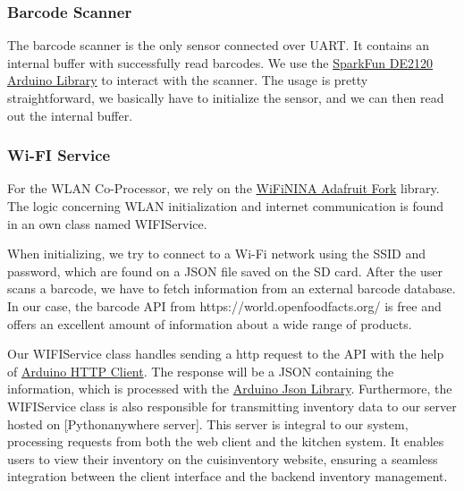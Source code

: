 \documentclass{article}
\begin{document}
\subsubsection{Barcode Scanner}
The barcode scanner is the only sensor connected over UART. It contains an internal buffer with successfully read barcodes.
We use the \href{https://github.com/sparkfun/SparkFun_DE2120_Arduino_Library}{SparkFun DE2120 Arduino Library} to interact with the scanner.
The usage is pretty straightforward, we basically have to initialize the sensor, and we can then read out the internal buffer.

\subsubsection{Wi-FI Service}
For the WLAN Co-Processor, we rely on the \href{https://github.com/adafruit/WiFiNINA}{WiFiNINA Adafruit Fork} library.
The logic concerning WLAN initialization and internet communication is found in an own class named WIFIService.

When initializing, we try to connect to a Wi-Fi network using the SSID and password, which are found on a JSON file saved on the SD card.
After the user scans a barcode, we have to fetch information from an external barcode database. In our case, the barcode API from https://world.openfoodfacts.org/ is free and offers an excellent amount of information about a wide range of products.

Our WIFIService class handles sending a http request to the API with the help of \href{https://github.com/arduino-libraries/ArduinoHttpClient}{Arduino HTTP Client}.
The response will be a JSON containing the information, which is processed with the \href{https://github.com/bblanchon/ArduinoJson}{Arduino Json Library}. Furthermore, the WIFIService class is also responsible for transmitting inventory data to our server hosted on \href{https://www.pythonanywhere.com/}[Pythonanywhere server]. This server is integral to our system, processing requests from both the web client and the kitchen system. It enables users to view their inventory on the cuisinventory website, ensuring a seamless integration between the client interface and the backend inventory management.
\end{document}
